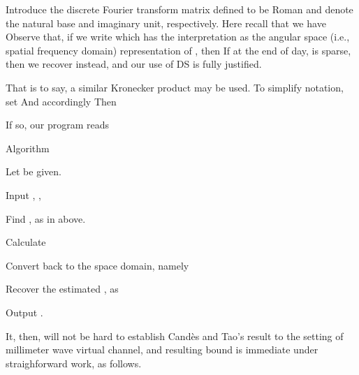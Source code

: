 \stopsection
\startsection [title={Working in the Angular Space}]

Introduce the discrete Fourier transform matrix  defined to be
Roman  and  denote the natural base and imaginary unit, respectively.
Here recall that we have
Observe that, if we write
which has the interpretation as the angular space (i.e., spatial frequency domain) representation of , then
If at the end of day,  is sparse, then we recover  instead, and our use of DS is fully justified.

That is to say, a similar Kronecker product may be used.
To simplify notation, set
And accordingly
Then

\stopsection
\startsection [title={Proposed Method}]

If so, our program reads

\Result
{Algorithm}
{
\startitemize[n]
\item Let  be given.
\item Input , ,
\item Find ,  as in above.
\item Calculate
\item Convert  back to the space domain, namely
\item Recover the estimated , as
\item Output .
\stopitemize
}

It, then, will not be hard to establish Cand\`es and Tao's result to the setting of millimeter wave virtual channel, and resulting bound is immediate under straighforward work, as follows.

\stopsection
\stopchapter
